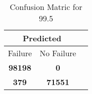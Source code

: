 \begin{table}[] 
\caption{Confusion Matric for 99.5} 
\label{Table: Prediction Accuracy-DMD99.5OnlySunEKF-combinationReflectionperfectNoFailurePrediction-Reflection} 
\centering 
\begin{tabular} 
 {@{}ccc@{}} 
\toprule 
\multicolumn{2}{c}{\textbf{Predicted}}
 \\ \midrule 
\multicolumn{1}{|c|}{Failure} & 
\multicolumn{1}{c|}{No Failure}
 \\ \midrule 
\multicolumn{1}{|c|}{\color{green}\textbf{98198}} & 
\multicolumn{1}{c|}{\color{red}\textbf{0}}
 \\ \midrule 
\multicolumn{1}{|c|}{\color{red}\textbf{379}} & 
\multicolumn{1}{c|}{\color{green}\textbf{71551}}
 \\ \bottomrule 
\end{tabular} 
\end{table} 
